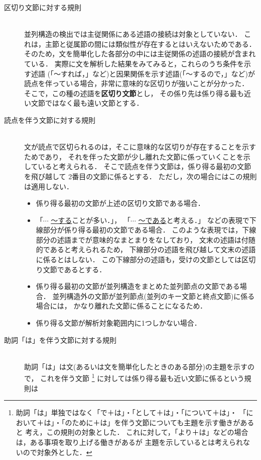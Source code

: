 \begin{description}
  \item[区切り文節に対する規則]　\\
並列構造の検出では主従関係にある述語の接続は対象としていない．
これは，主節と従属節の間には類似性が存在するとはいえないためである．
そのため，文を簡単化した各部分の中には主従関係の述語の接続が含まれている．
実際に文を解析した結果をみてみると，これらのうち条件を示す述語
(「〜すれば，」など)と因果関係を示す述語(「〜するので，」など)が
読点を伴っている場合，非常に意味的な区切りが強いことが分かった．
そこで，この種の述語を{\bf 区切り文節}とし，
その係り先は係り得る最も近い文節ではなく最も遠い文節とする．
  \item[読点を伴う文節に対する規則]　\\
文が読点で区切られるのは，そこに意味的な区切りが存在することを示すためであり，
それを伴った文節が少し離れた文節に係っていくことを示していると考えられる．
そこで読点を伴う文節は，係り得る最初の文節を飛び越して
2番目の文節に係るとする．
ただし，次の場合にはこの規則は適用しない．
\begin{itemize}
  \item 
係り得る最初の文節が上述の区切り文節である場合．
  \item 
「$\cdots$ \underline{〜する}ことが多い．」，
「$\cdots$ \underline{〜である}と考える．」
などの表現で下線部分が係り得る最初の文節である場合．
このような表現では，下線部分の述語までが意味的なまとまりをなしており，
文末の述語は付随的であると考えられるため，
下線部分の述語を飛び越して文末の述語に係るとはしない．
この下線部分の述語も，受けの文節としては区切り文節であるとする．
  \item 
係り得る最初の文節が並列構造をまとめた並列節点の文節である場合．
並列構造外の文節が並列節点(並列のキー文節と終点文節)に係る場合には，
かなり離れた文節に係ることになるため．
  \item 
係り得る文節が解析対象範囲内に1つしかない場合．
\end{itemize}
  \item[助詞「は」を伴う文節に対する規則]　\\
助詞「は」は文(あるいは文を簡単化したときのある部分)の主題を示すので，
これを伴う文節
\footnote{
助詞「は」単独ではなく「で＋は」・「として＋は」・「について＋は」・
「において＋は」・「のために＋は」を伴う文節についても主題を示す働きがあると
考え，この規則の対象とした．
これに対して，「より＋は」などの場合は，ある事項を取り上げる働きがあるが
主題を示しているとは考えられないので対象外とした．
}
に対しては係り得る最も近い文節に係るという規則は

\end{description}
